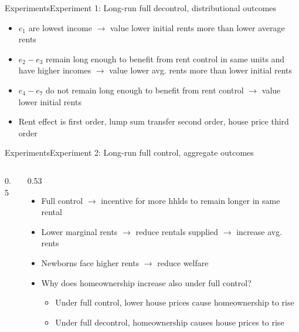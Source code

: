 \documentclass[11pt,aspectratio=169]{beamer}
\begin{document}
\begin{frame}{Experiments}{Experiment 1: Long-run full decontrol, distributional outcomes}



\begin{itemize}
    \item $e_{1}$ are lowest income $\rightarrow$ value lower initial rents more than lower average rents
    \item $e_{2}-e_{3}$ remain long enough to benefit from rent control in same units and have higher incomes $\rightarrow$ value lower avg. rents more than lower initial rents
    \item $e_{4}-e_{7}$ do not remain long enough to benefit from rent control $\rightarrow$ value lower initial rents 
    \item Rent effect is first order, lump sum transfer second order, house price third order
\end{itemize}

\end{frame}

\begin{frame}{Experiments}{Experiment 2: Long-run full control, aggregate outcomes}

\begin{columns}[T]
\begin{column}{0.5\textwidth}

\end{column}
\begin{column}{0.53\textwidth}
    \begin{itemize}
    \item Full control $\rightarrow$ incentive for more hhlds to remain longer in same rental 
    \item Lower marginal rents $\rightarrow$ reduce rentals supplied $\rightarrow$ increase avg. rents    
    \item Newborns face higher rents $\rightarrow$ reduce welfare 
    \item Why does homeownership increase also under full control?
    \begin{itemize}
        \item Under full control, lower house prices cause homeownership to rise
        \item Under full decontrol, homeownership causes house prices to rise
    \end{itemize}
    \end{itemize}
\end{column}

\end{columns}
\end{frame}
\end{document}
